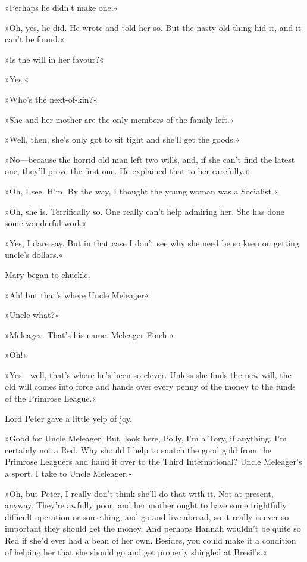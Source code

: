 »Perhaps he didn't make one.«

»Oh, yes, he did. He wrote and told her so. But the nasty old thing hid it, and it can't be found.«

»Is the will in her favour?«

»Yes.«

»Who's the next-of-kin?«

»She and her mother are the only members of the family left.«

»Well, then, she's only got to sit tight and she'll get the goods.«

»No—because the horrid old man left two wills, and, if she can't find the latest one, they'll prove the first one. He explained that to her carefully.«

»Oh, I see. H'm. By the way, I thought the young woman was a Socialist.«

»Oh, she is. Terrifically so. One really can't help admiring her. She has done some wonderful work\longdash«

»Yes, I dare say. But in that case I don't see why she need be so keen on getting uncle's dollars.«

Mary began to chuckle.

»Ah! but that's where Uncle Meleager\longdash«

»Uncle what?«

»Meleager. That's his name. Meleager Finch.«

»Oh!«

»Yes—well, that's where he's been so clever. Unless she finds the new will, the old will comes into force and hands over every penny of the money to the funds of the Primrose League.«

Lord Peter gave a little yelp of joy.

»Good for Uncle Meleager! But, look here, Polly, I'm a Tory, if anything. I'm certainly not a Red. Why should I help to snatch the good gold from the Primrose Leaguers and hand it over to the Third International? Uncle Meleager's a sport. I take to Uncle Meleager.«

»Oh, but Peter, I really don't think she'll do that with it. Not at present, anyway. They're awfully poor, and her mother ought to have some frightfully difficult operation or something, and go and live abroad, so it really is ever so important they should get the money. And perhaps Hannah wouldn't be quite so Red if she'd ever had a bean of her own. Besides, you could make it a condition of helping her that she should go and get properly shingled at Bresil's.«

